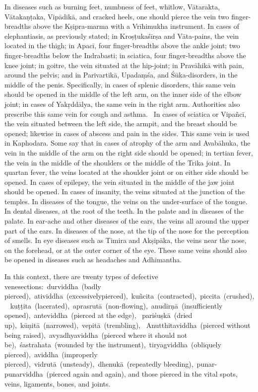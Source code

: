 \begin{translation}
\begin{tt}
\item[17]
In diseases such as burning feet, numbness of feet, whitlow, Vātarakta, Vātakaṇṭaka, Vipādikā, and cracked heels, one should pierce the vein two finger-breadths above the Kṣipra-marma with a Vrīhimukha instrument.
In cases of elephantiasis, as previously stated; in Kroṣṭukaśīrṣa and Vāta-pains, the vein located in the thigh; in Apacī, four finger-breadths above the ankle joint; two finger-breadths below the Indrabasti; in sciatica, four finger-breadths above the knee joint; in goitre, the vein situated at the hip-joint; in Pravāhikā with pain, around the pelvis; and in Parivartikā, Upadaṃśa, and Śūka-disorders, in the middle of the penis.
Specifically, in cases of splenic disorders, this same vein should be opened in the middle of the left arm, on the inner side of the elbow joint; in cases of Yakṛddālya, the same vein in the right arm.
Authorities also prescribe this same vein for cough and asthma. 
In cases of sciatica or Vipañcī, the vein situated between the left side, the armpit, and the breast should be opened; likewise in cases of abscess and pain in the sides.
This same vein is used in Kaphodara.
Some say that in cases of atrophy of the arm and Avabāhuka, the vein in the middle of the arm on the right side should be opened; in tertian fever, the vein in the middle of the shoulders or the middle of the Trika joint.
In quartan fever, the veins located at the shoulder joint or on either side should be opened.
In cases of epilepsy, the vein situated in the middle of the jaw joint should be opened.
In cases of insanity, the veins situated at the junction of the temples.
In diseases of the tongue, the veins on the under-surface of the tongue.
In dental diseases, at the root of the teeth.
In the palate and in diseases of the palate.
In ear-ache and other diseases of the ears, the veins all around the upper part of the ears.
In diseases of the nose, at the tip of the nose for the perception of smells.
In eye diseases such as Timira and Akṣipāka, the veins near the nose, on the forehead, or at the outer corner of the eye.
These same veins should also be opened in diseases such as headaches and Adhimantha.

\item[18]
In this context, there are twenty types of defective venesections: durviddha (badly pierced), atividdha (excessivelypierced), kuñcita (contracted), piccita (crushed),  kuṭṭita (lacerated), aprasrutā (non-flowing), anudīrṇā (insufficiently opened), anteviddha (pierced at the edge),  pariśuṣkā (dried up), kūṇitā (narrowed), vepitā (trembling), 
Anutthitaviddha (pierced without being raised), avyadhyaviddha (pierced where it should not be), śastrahata (wounded by the instrument), tiryagviddha (obliquely pierced), aviddha (improperly pierced), vidrutā (unsteady), dhenukā (repeatedly bleeding), punar-punarviddha (pierced again and again), and those pierced in the vital spots, veins, ligaments, bones, and joints.


\end{tt}
\end{translation}

